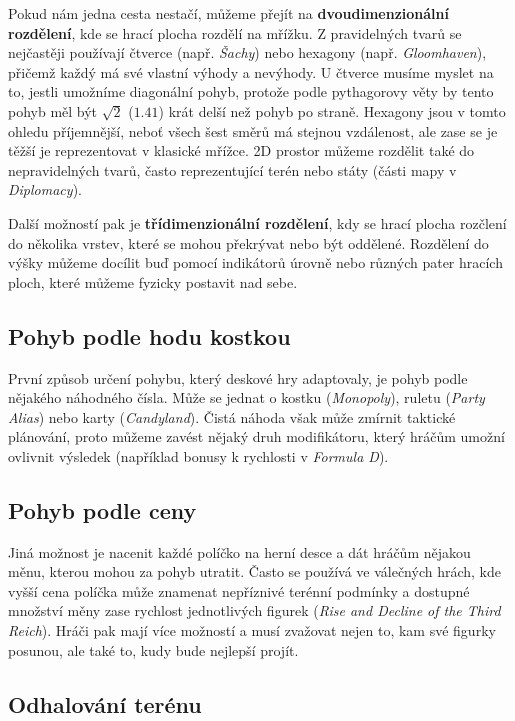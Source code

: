 Pokud nám jedna cesta nestačí, můžeme přejít na \textbf{dvoudimenzionální rozdělení}, kde se hrací plocha rozdělí na mřížku. Z pravidelných tvarů se nejčastěji používají čtverce (např. \textit{Šachy}) nebo hexagony (např. \textit{Gloomhaven}), přičemž každý má své vlastní výhody a nevýhody. U čtverce musíme myslet na to, jestli umožníme diagonální pohyb, protože podle pythagorovy věty by tento pohyb měl být $\sqrt{2}$ ($1.41$) krát delší než pohyb po straně. Hexagony jsou v tomto ohledu příjemnější, neboť všech šest směrů má stejnou vzdálenost, ale zase se je těžší je reprezentovat v klasické mřížce. 2D prostor můžeme rozdělit také do nepravidelných tvarů, často reprezentující terén nebo státy (části mapy v \textit{Diplomacy}).

Další možností pak je \textbf{třídimenzionální rozdělení}, kdy se hrací plocha rozčlení do několika vrstev, které se mohou překrývat nebo být oddělené. Rozdělení do výšky můžeme docílit buď pomocí indikátorů úrovně nebo různých pater hracích ploch, které můžeme fyzicky postavit nad sebe.

\subsection{Pohyb podle hodu kostkou}
\label{subsec:roll_movement}

První způsob určení pohybu, který deskové hry adaptovaly, je pohyb podle nějakého náhodného čísla. Může se jednat o kostku (\textit{Monopoly}), ruletu (\textit{Party Alias}) nebo karty (\textit{Candyland}). Čistá náhoda však může zmírnit taktické plánování, proto můžeme zavést nějaký druh modifikátoru, který hráčům umožní ovlivnit výsledek (například bonusy k rychlosti v \textit{Formula D}).

\subsection{Pohyb podle ceny}
\label{subsec:cost_movement}

Jiná možnost je nacenit každé políčko na herní desce a dát hráčům nějakou měnu, kterou mohou za pohyb utratit. Často se používá ve válečných hrách, kde vyšší cena políčka může znamenat nepříznivé terénní podmínky a dostupné množství měny zase rychlost jednotlivých figurek (\textit{Rise and Decline of the Third Reich}). Hráči pak mají více možností a musí zvažovat nejen to, kam své figurky posunou, ale také to, kudy bude nejlepší projít.

\subsection{Odhalování terénu}
\label{subsec:map_reveal}

